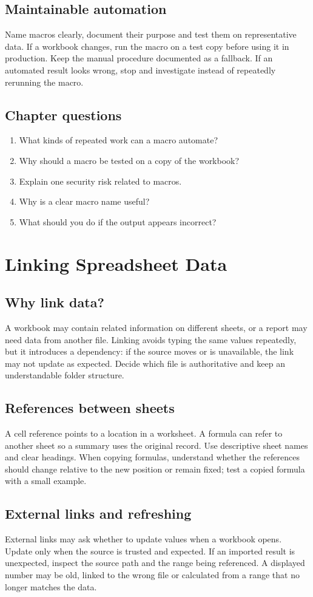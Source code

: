 \documentclass[11pt,openany,oneside]{book}
\begin{document}
\section{Maintainable automation}
Name macros clearly, document their purpose and test them on representative data. If a workbook changes, run the macro on a test copy before using it in production. Keep the manual procedure documented as a fallback. If an automated result looks wrong, stop and investigate instead of repeatedly rerunning the macro.
\section{Chapter questions}
\begin{enumerate}\item What kinds of repeated work can a macro automate?\item Why should a macro be tested on a copy of the workbook?\item Explain one security risk related to macros.\item Why is a clear macro name useful?\item What should you do if the output appears incorrect?\end{enumerate}

\chapter{Linking Spreadsheet Data}
\section{Why link data?}
A workbook may contain related information on different sheets, or a report may need data from another file. Linking avoids typing the same values repeatedly, but it introduces a dependency: if the source moves or is unavailable, the link may not update as expected. Decide which file is authoritative and keep an understandable folder structure.
\section{References between sheets}
A cell reference points to a location in a worksheet. A formula can refer to another sheet so a summary uses the original record. Use descriptive sheet names and clear headings. When copying formulas, understand whether the references should change relative to the new position or remain fixed; test a copied formula with a small example.
\section{External links and refreshing}
External links may ask whether to update values when a workbook opens. Update only when the source is trusted and expected. If an imported result is unexpected, inspect the source path and the range being referenced. A displayed number may be old, linked to the wrong file or calculated from a range that no longer matches the data.
\end{document}

